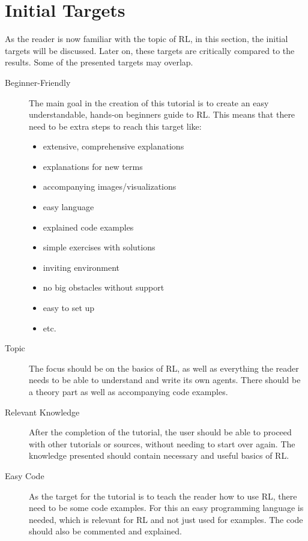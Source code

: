 \documentclass[10pt,a4paper]{article}
\begin{document}
	

	\section{Initial Targets}
		As the reader is now familiar with the topic of RL, in this section, the initial targets will be discussed. Later on, these targets are critically compared to the results. Some of the presented targets may overlap.
		
		\begin{description}
			\item[Beginner-Friendly] 	The main goal in the creation of this tutorial is to create an easy understandable, hands-on beginners guide to RL.
			This means that there need to be extra steps to reach this target like:
			\begin{itemize}
				\item extensive, comprehensive explanations
				\item explanations for new terms
				\item accompanying images/visualizations
				\item easy language
				\item explained code examples
				\item simple exercises with solutions
				\item inviting environment 
				\item no big obstacles without support
				\item easy to set up
				\item etc.
			\end{itemize}
			
			\item[Topic] The focus should be on the basics of RL, as well as everything the reader needs to be able to understand and write its own agents. There should be a theory part as well as accompanying code examples.
		
			\item[Relevant Knowledge] After the completion of the tutorial, the user should be able to proceed with other tutorials or sources, without needing to start over again. The knowledge presented should contain necessary and useful basics of RL.
			
			\item[Easy Code] As the target for the tutorial is to teach the reader how to use RL, there need to be some code examples. For this an easy programming language is needed, which is relevant for RL and not just used for examples. The code should also be commented and explained.
			

\end{description}
\end{document}
